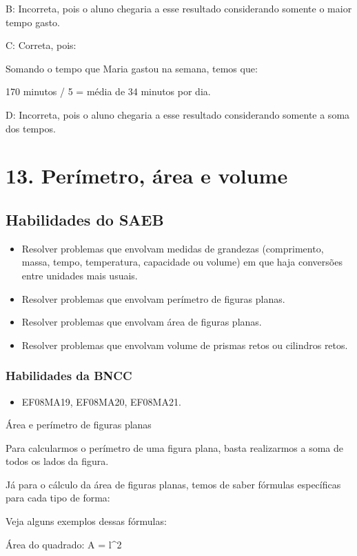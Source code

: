 {B: Incorreta, pois o aluno chegaria a esse resultado considerando
somente o maior tempo gasto.

C: Correta, pois:

Somando o tempo que Maria gastou na semana, temos que:

170 minutos / 5 = média de 34 minutos por dia.

D: Incorreta, pois o aluno chegaria a esse resultado considerando
somente a soma dos tempos.


\chapter{13. Perímetro, área e
volume}

\section{Habilidades do SAEB}

\begin{itemize}
\item Resolver problemas que envolvam medidas de
grandezas (comprimento, massa, tempo, temperatura, capacidade ou volume)
em que haja conversões entre unidades mais usuais.
\item
  Resolver problemas que envolvam perímetro de figuras planas.
\item
  Resolver problemas que envolvam área de figuras planas.
\item
  Resolver problemas que envolvam volume de prismas retos ou cilindros
  retos.
\end{itemize}

\subsection{Habilidades da BNCC}

\begin{itemize}
\item EF08MA19, EF08MA20, EF08MA21.
\end{itemize}

Área e perímetro de figuras planas

Para calcularmos o perímetro de uma figura plana, basta realizarmos a
soma de todos os lados da figura.

Já para o cálculo da área de figuras planas, temos de saber fórmulas
específicas para cada tipo de forma:

Veja alguns exemplos dessas fórmulas:

Área do quadrado: A = l^2

}
